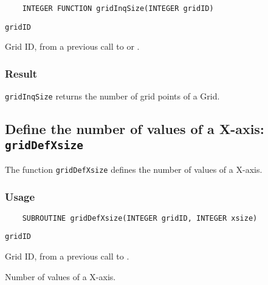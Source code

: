 \begin{verbatim}
    INTEGER FUNCTION gridInqSize(INTEGER gridID)
\end{verbatim}

\hspace*{4mm}\begin{minipage}[]{15cm}
\begin{deflist}{\tt gridID\ }
\item[{\tt gridID}]
Grid ID, from a previous call to {} or {}.

\end{deflist}
\end{minipage}

\subsubsection*{Result}

{\tt gridInqSize} returns the number of grid points of a Grid.



\subsection{Define the number of values of a X-axis: {\tt gridDefXsize}}
\label{gridDefXsize}

The function {\tt gridDefXsize} defines the number of values of a X-axis.

\subsubsection*{Usage}

\begin{verbatim}
    SUBROUTINE gridDefXsize(INTEGER gridID, INTEGER xsize)
\end{verbatim}

\hspace*{4mm}\begin{minipage}[]{15cm}
\begin{deflist}{\tt gridID\ }
\item[{\tt gridID}]
Grid ID, from a previous call to {}.
\item[{\tt xsize}]
Number of values of a X-axis.

\end{deflist}
\end{minipage}


